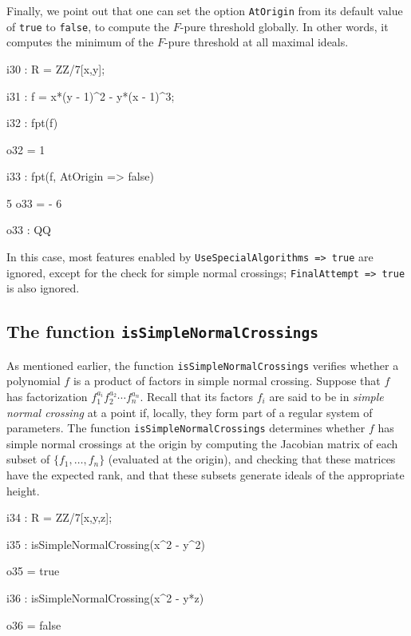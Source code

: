 \documentclass{amsart}
\begin{document}
Finally, we point out that one can set the option \texttt{AtOrigin} from its default value of \texttt{true} to \texttt{false}, to compute the $F$-pure threshold globally. In other words, it computes the minimum of the $F$-pure threshold at all maximal ideals.

\smallskip
{\small
{}
\begin{MyVerbatim}
i30 : R = ZZ/7[x,y];

i31 : f = x*(y - 1)^2 - y*(x - 1)^3;

i32 : fpt(f)

o32 = 1

i33 : fpt(f, AtOrigin => false)

      5
o33 = -
      6

o33 : QQ
\end{MyVerbatim}
}
\smallskip

\noindent In this case, most features enabled by \texttt{UseSpecialAlgorithms => true}
are ignored, except for the check for simple normal crossings;  \texttt{FinalAttempt => true}
is also ignored.

\subsection{The function \texttt{isSimpleNormalCrossings}} \label{subsec.SNC}
As mentioned earlier, the function \texttt{isSimpleNormalCrossings} verifies whether a polynomial $f$ is a product of factors in simple normal crossing.
Suppose that $f$ has factorization $f_1^{a_i} f_2^{a_2} \cdots f_n^{a_n}$.  Recall that its factors $f_i$ are said to be in
\emph{simple normal crossing} at a point if, locally, they form part of a regular system of parameters.  The function \texttt{isSimpleNormalCrossings} determines whether $f$ has simple normal crossings at the origin by computing the Jacobian matrix of each subset of $\{ f_1, \ldots, f_n \}$ (evaluated at the origin), and checking that these matrices have the expected rank, and that these subsets generate ideals of the appropriate height.

\smallskip
{\small
{}
\begin{MyVerbatim}
i34 : R = ZZ/7[x,y,z];

i35 : isSimpleNormalCrossing(x^2 - y^2)

o35 = true

i36 : isSimpleNormalCrossing(x^2 - y*z)

o36 = false
\end{MyVerbatim}
}
\smallskip
\end{document}
